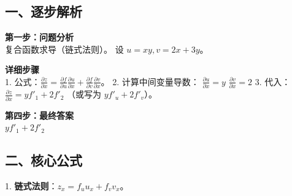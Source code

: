 \documentclass[12pt, a4paper]{ctexart}
\newenvironment{RedAnalysis}{
    \par
    \color{red} %
}{
    \par
    \color{black} %
}
\begin{document}
\begin{RedAnalysis}

\subsection*{一、逐步解析}

\textbf{第一步：问题分析} \\
复合函数求导（链式法则）。
设 $u = xy, v = 2x+3y$。

\textbf{详细步骤} \\
1. 公式：$\frac{\partial z}{\partial x} = \frac{\partial f}{\partial u} \frac{\partial u}{\partial x} + \frac{\partial f}{\partial v} \frac{\partial v}{\partial x}$。
2. 计算中间变量导数：
   $\frac{\partial u}{\partial x} = y$
   $\frac{\partial v}{\partial x} = 2$
3. 代入：
   $\frac{\partial z}{\partial x} = y f'_1 + 2 f'_2$ （或写为 $y f'_u + 2 f'_v$）。

\textbf{第四步：最终答案} \\
$ y f'_1 + 2 f'_2 $

\subsection*{二、核心公式}
1. \textbf{链式法则}：$z_x = f_u u_x + f_v v_x$。

\end{RedAnalysis}
\end{document}
